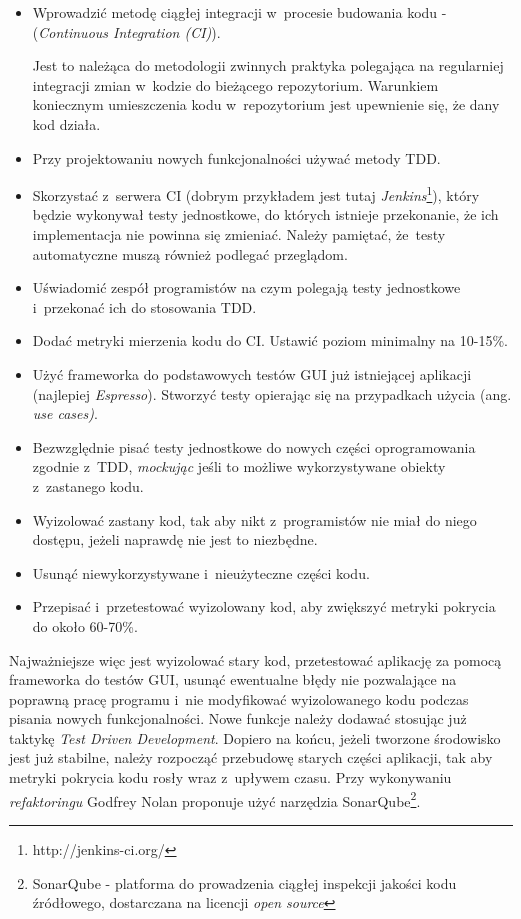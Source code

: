 \begin{itemize}
\item 
Wprowadzić metodę ciągłej integracji w~procesie budowania kodu -  (\textit{Continuous Integration (CI)}).

Jest to należąca do metodologii zwinnych praktyka polegająca na regularniej integracji zmian w~kodzie do bieżącego repozytorium. Warunkiem koniecznym umieszczenia kodu w~repozytorium jest upewnienie się, że dany kod działa.

\item
Przy projektowaniu nowych funkcjonalności używać metody TDD.

\item
Skorzystać z~serwera CI (dobrym przykładem jest tutaj \textit{Jenkins}\footnote{http://jenkins-ci.org/}), który będzie wykonywał testy jednostkowe, do których istnieje przekonanie, że ich implementacja nie powinna się zmieniać. Należy pamiętać, że~testy automatyczne muszą również podlegać przeglądom.

\item
Uświadomić zespół programistów na czym polegają testy jednostkowe i~przekonać ich do stosowania TDD.

\item
Dodać metryki mierzenia kodu do CI. Ustawić poziom minimalny na 10-15\%.

\item
Użyć frameworka do podstawowych testów GUI już istniejącej aplikacji (najlepiej \textit{Espresso}). Stworzyć testy opierając się na przypadkach użycia (ang. \textit{use cases)}.

\item
Bezwzględnie pisać testy jednostkowe do nowych części oprogramowania zgodnie z~TDD, \textit{mockując} jeśli to możliwe wykorzystywane obiekty z~zastanego kodu.

\item
Wyizolować zastany kod, tak aby nikt z~programistów nie miał do niego dostępu, jeżeli naprawdę nie jest to niezbędne.

\item
Usunąć niewykorzystywane i~nieużyteczne części kodu.

\item
Przepisać i~przetestować wyizolowany kod, aby zwiększyć metryki pokrycia do około 60-70\%. 
\end{itemize}

Najważniejsze więc jest wyizolować stary kod, przetestować aplikację za pomocą frameworka do testów GUI, usunąć ewentualne błędy nie pozwalające na poprawną pracę programu i~nie modyfikować wyizolowanego kodu podczas pisania nowych funkcjonalności. Nowe funkcje należy dodawać stosując już taktykę \textit{Test Driven Development}. Dopiero na końcu, jeżeli tworzone środowisko jest już stabilne, należy rozpocząć przebudowę starych części aplikacji, tak aby metryki pokrycia kodu rosły wraz z~upływem czasu. Przy wykonywaniu \textit{refaktoringu} Godfrey Nolan proponuje użyć narzędzia SonarQube\footnote{SonarQube - platforma do prowadzenia ciągłej inspekcji jakości kodu źródłowego, dostarczana na licencji \textit{open source}}.


